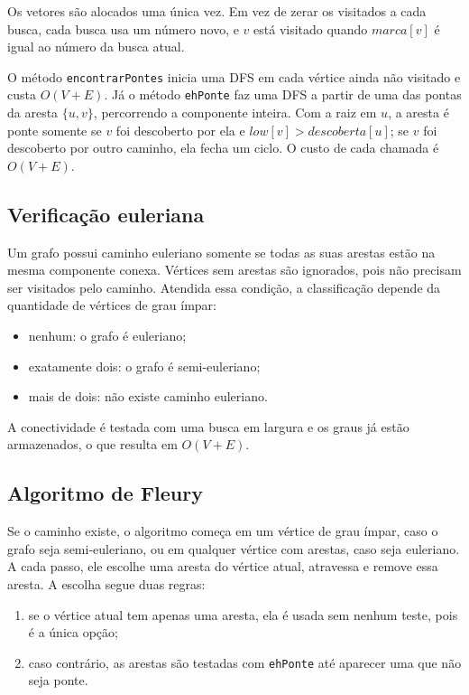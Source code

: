 Os vetores são alocados uma única vez. Em vez de zerar os visitados a cada busca, cada busca usa um número novo, e $v$ está visitado quando $marca[v]$ é igual ao número da busca atual.

O método \texttt{encontrarPontes} inicia uma DFS em cada vértice ainda não visitado e custa $O(V + E)$. Já o método \texttt{ehPonte} faz uma DFS a partir de uma das pontas da aresta $\{u, v\}$, percorrendo a componente inteira. Com a raiz em $u$, a aresta é ponte somente se $v$ foi descoberto por ela e $low[v] > descoberta[u]$; se $v$ foi descoberto por outro caminho, ela fecha um ciclo. O custo de cada chamada é $O(V + E)$.

\subsection{Verificação euleriana}

Um grafo possui caminho euleriano somente se todas as suas arestas estão na mesma componente conexa. Vértices sem arestas são ignorados, pois não precisam ser visitados pelo caminho. Atendida essa condição, a classificação depende da quantidade de vértices de grau ímpar:

\begin{itemize}
  \item nenhum: o grafo é euleriano;
  \item exatamente dois: o grafo é semi-euleriano;
  \item mais de dois: não existe caminho euleriano.
\end{itemize}

A conectividade é testada com uma busca em largura e os graus já estão armazenados, o que resulta em $O(V + E)$.

\subsection{Algoritmo de Fleury}

Se o caminho existe, o algoritmo começa em um vértice de grau ímpar, caso o grafo seja semi-euleriano, ou em qualquer vértice com arestas, caso seja euleriano. A cada passo, ele escolhe uma aresta do vértice atual, atravessa e remove essa aresta. A escolha segue duas regras:

\begin{enumerate}
  \item se o vértice atual tem apenas uma aresta, ela é usada sem nenhum teste, pois é a única opção;
  \item caso contrário, as arestas são testadas com \texttt{ehPonte} até aparecer uma que não seja ponte.
\end{enumerate}

